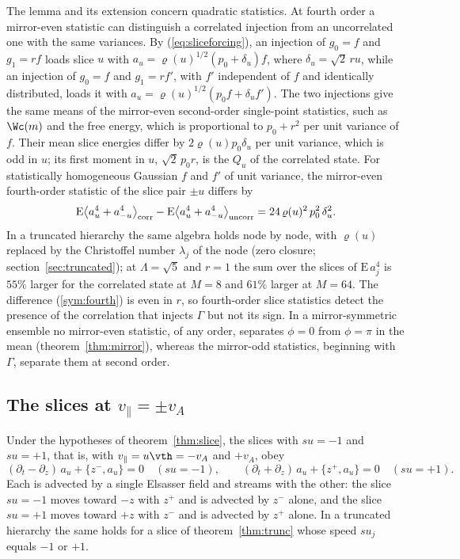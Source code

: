 The lemma and its extension concern quadratic statistics. At fourth order a mirror-even statistic can distinguish a correlated injection from an uncorrelated one with the same variances. By (\ref{eq:sliceforcing}), an injection of $g_0=f$ and $g_1=rf$ loads slice $u$ with $a_u=\varrho(u)^{1/2}(p_0+\delta_u)f$, where $\delta_u=\sqrt2\,ru$, while an injection of $g_0=f$ and $g_1=rf'$, with $f'$ independent of $f$ and identically distributed, loads it with $a_u=\varrho(u)^{1/2}(p_0f+\delta_uf')$. The two injections give the same means of the mirror-even second-order single-point statistics, such as $\Wc(m)$ and the free energy, which is proportional to $p_0+r^2$ per unit variance of $f$. Their mean slice energies differ by $2\varrho(u)p_0\delta_u$ per unit variance, which is odd in $u$; its first moment in $u$, $\sqrt2\,p_0r$, is the $Q_u$ of the correlated state. For statistically homogeneous Gaussian $f$ and $f'$ of unit variance, the mirror-even fourth-order statistic of the slice pair $\pm u$ differs by
\begin{equation}\label{sym:fourth}
  \mathrm E\big\langle a_u^4+a_{-u}^4\big\rangle_{\rm corr}-\mathrm E\big\langle a_u^4+a_{-u}^4\big\rangle_{\rm uncorr}
  =24\,\varrho(u)^2\,p_0^2\,\delta_u^2 .
\end{equation}
In a truncated hierarchy the same algebra holds node by node, with $\varrho(u)$ replaced by the Christoffel number $\lambda_j$ of the node (zero closure; section~\ref{sec:truncated}); at $\Lambda=\sqrt5$ and $r=1$ the sum over the slices of $\mathrm E\,a_j^4$ is $55\%$ larger for the correlated state at $M=8$ and $61\%$ larger at $M=64$. The difference (\ref{sym:fourth}) is even in $r$, so fourth-order slice statistics detect the presence of the correlation that injects $\Gamma$ but not its sign. In a mirror-symmetric ensemble no mirror-even statistic, of any order, separates $\phi=0$ from $\phi=\pi$ in the mean (theorem~\ref{thm:mirror}), whereas the mirror-odd statistics, beginning with $\Gamma$, separate them at second order.

\subsection{The slices at \texorpdfstring{$v_\parallel=\pm v_A$}{v = +-vA}}\label{sym:vA}

\begin{proposition}\label{prop:elsasser}
Under the hypotheses of theorem~\ref{thm:slice}, the slices with $su=-1$ and $su=+1$, that is, with $v_\parallel=u\vth=-v_A$ and $+v_A$, obey
\begin{equation}\label{sym:elsasser}
  (\partial_t-\partial_z)\,a_u+\{z^-,a_u\}=0\quad(su=-1),\qquad
  (\partial_t+\partial_z)\,a_u+\{z^+,a_u\}=0\quad(su=+1).
\end{equation}
Each is advected by a single Elsasser field and streams with the other: the slice $su=-1$ moves toward $-z$ with $z^+$ and is advected by $z^-$ alone, and the slice $su=+1$ moves toward $+z$ with $z^-$ and is advected by $z^+$ alone. In a truncated hierarchy the same holds for a slice of theorem~\ref{thm:trunc} whose speed $su_j$ equals $-1$ or $+1$.
\end{proposition}

